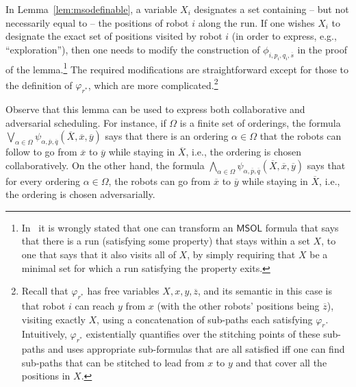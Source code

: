 \documentclass{llncs}
\newcommand{\tup}[1]{\overline{#1}}
\def\msol{\mathsf{MSOL}}
\newcommand{\sr}[1]{\footnote{{\color{red} Note. #1}}}
\renewcommand{\sr}[1]{}
\begin{document}
In Lemma~\ref{lem:msodefinable}, a variable $X_i$ designates a set containing
-- but not necessarily equal to -- the positions of robot $i$ along the run.
If one wishes $X_i$ to designate the exact set of positions
visited by robot $i$ (in order to express, e.g., ``exploration''),
then one needs to modify the construction of $\phi_{i,p_i,q_i,\tup{s}}$ in the proof of the
lemma.\footnote{In~\cite{Rubin15AAMAS} it is wrongly stated that one can transform an
$\msol$ formula that says that there is a run (satisfying some property) that stays within a set
$X$, to one that says that it also visits all of $X$, by simply requiring that $X$ be a minimal
set for which a run satisfying the property exits.} The required modifications are
straightforward except for those to the definition of $\varphi_{r^*}$, which are more
complicated.\footnote{Recall that $\varphi_{r^*}$ has free variables $X,x,y,\tup{z}$, and its
semantic in this case is that robot $i$ can reach $y$ from $x$ (with the other robots' positions
being $\tup{z}$), visiting exactly $X$, using a concatenation of sub-paths each satisfying
$\varphi_{r}$. Intuitively, $\varphi_{r^*}$ existentially quantifies over
the stitching points of these sub-paths and uses appropriate sub-formulas that are all
satisfied iff one can find sub-paths that can be stitched to lead from $x$ to $y$ and that cover
all the positions in $X$.}

Observe that this lemma can be used to express both collaborative and adversarial scheduling.  For instance, if $\Omega$ is a finite set of orderings,
the formula
$
\bigvee_{\alpha \in \Omega} \psi_{\alpha,\tup{p},\tup{q}}(\tup{X},\tup{x},\tup{y})
$
says that there is an ordering $\alpha \in \Omega$ that the robots can follow to go from $\tup{x}$ to $\tup{y}$ while staying in $\tup{X}$, i.e., the ordering is chosen collaboratively. On the other hand, the formula
$
\bigwedge_{\alpha \in \Omega} \psi_{\alpha,\tup{p},\tup{q}}(\tup{X},\tup{x},\tup{y})
$
says that for every ordering $\alpha \in \Omega$, the robots can go from $\tup{x}$ to $\tup{y}$ while staying in $\tup{X}$, i.e., the ordering is chosen adversarially.



%
\end{document}

